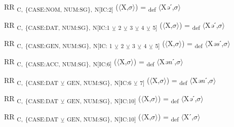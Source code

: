 {\begin{exe}
 RR \textsubscript{C,} \textsubscript{\{CASE:NOM, NUM:SG\},} \textsubscript{N[IC:2]} ($\langle$X,$\sigma $$\rangle$) = \textsubscript{def} $\langle$X\textit{ə}ˊ,$\sigma $$\rangle$
\end{exe}

\begin{exe}
 RR \textsubscript{C,} \textsubscript{\{CASE:DAT, NUM:SG\},} \textsubscript{N[IC:1} \textsubscript{${\veebar}$}\textsubscript{ 2} \textsubscript{${\veebar}$}\textsubscript{ 3} \textsubscript{${\veebar}$}\textsubscript{ 4} \textsubscript{${\veebar}$}\textsubscript{ 5]} ($\langle$X,$\sigma $$\rangle$) = \textsubscript{def} $\langle$X\textit{ə}ˊ,$\sigma $$\rangle$
\end{exe}

\begin{exe}
 RR \textsubscript{C,} \textsubscript{\{CASE:GEN, NUM:SG\},} \textsubscript{N[IC: 1} \textsubscript{${\veebar}$}\textsubscript{ 2} \textsubscript{${\veebar}$}\textsubscript{ 3} \textsubscript{${\veebar}$}\textsubscript{ 4} \textsubscript{${\veebar}$}\textsubscript{ 5]} ($\langle$X,$\sigma $$\rangle$) = \textsubscript{def} $\langle$X\textit{əs}ˊ,$\sigma $$\rangle$
\end{exe}

\begin{exe}
 RR \textsubscript{C,} \textsubscript{\{CASE:ACC, NUM:SG\},} \textsubscript{N[IC:6]} ($\langle$X,$\sigma $$\rangle$) = \textsubscript{def} $\langle$X\textit{ən}ˊ,$\sigma $$\rangle$
\end{exe}

\begin{exe}
 RR \textsubscript{C,} \textsubscript{\{CASE:DAT} \textsubscript{${\veebar}$}\textsubscript{ GEN, NUM:SG\},} \textsubscript{N[IC:6} \textsubscript{${\veebar}$}\textsubscript{ 7]} ($\langle$X,$\sigma $$\rangle$) = \textsubscript{def} $\langle$X\textit{ən}ˊ,$\sigma $$\rangle$
\end{exe}

\begin{exe}
 RR \textsubscript{C,} \textsubscript{\{CASE:DAT} \textsubscript{${\veebar}$}\textsubscript{ GEN, NUM:SG\},} \textsubscript{N[IC:10]} ($\langle$X,$\sigma $$\rangle$) = \textsubscript{def} $\langle$X\textit{ə}ˊ,$\sigma $$\rangle$
\end{exe}

\begin{exe}
 RR \textsubscript{C,} \textsubscript{\{CASE:DAT} \textsubscript{${\veebar}$}\textsubscript{ GEN, NUM:SG\},} \textsubscript{N[IC:10]} ($\langle$X,$\sigma $$\rangle$) = \textsubscript{def} $\langle$Xˊ,$\sigma $$\rangle$
\end{exe}

}
